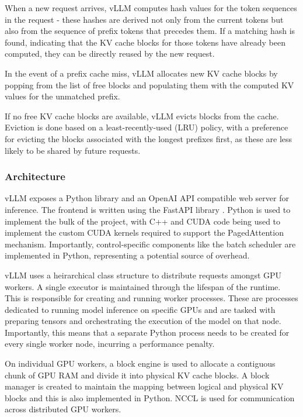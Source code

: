 \documentclass[12pt,twoside]{report}
\begin{document}
When a new request arrives, vLLM computes hash values for the token sequences in the request - these hashes are derived not only from the current tokens but also from the sequence of prefix tokens that precedes them. 
If a matching hash is found, indicating that the KV cache blocks for those tokens have already been computed, they can be directly reused by the new request.

In the event of a prefix cache miss, vLLM allocates new KV cache blocks by popping from the list of free blocks and populating them with the computed KV values for the unmatched prefix.

If no free KV cache blocks are available, vLLM evicts blocks from the cache. 
Eviction is done based on a least-recently-used (LRU) policy, with a preference for evicting the blocks associated with the longest prefixes first, as these are less likely to be shared by future requests.


\subsubsection{Architecture}
vLLM exposes a Python library and an OpenAI API \cite{openaiapi} compatible web server for inference.
The frontend is written using the FastAPI library \cite{fastapi}.
Python is used to implement the bulk of the project, with C++ and CUDA code being used to implement the custom CUDA kernels required to support the PagedAttention mechanism.
Importantly, control-specific components like the batch scheduler are implemented in Python, representing a potential source of overhead.

vLLM uses a heirarchical class structure to distribute requests amongst GPU workers.
A single executor is maintained through the lifespan of the runtime.
This is responsible for creating and running worker processes.
These are processes dedicated to running model inference on specific GPUs and are tasked with preparing tensors and orchestrating the execution of the model on that node. 
Importantly, this means that a separate Python process needs to be created for every single worker node, incurring a performance penalty.

On individual GPU workers, a block engine is used to allocate a contiguous chunk of GPU RAM and divide it into physical KV cache blocks.
A block manager is created to maintain the mapping between logical and physical KV blocks and this is also implemented in Python. 
NCCL \cite{nccl} is used for communication across distributed GPU workers.
\end{document}
